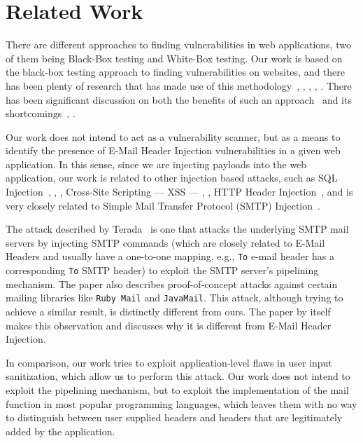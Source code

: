 \section{Related Work}

There are different approaches to finding vulnerabilities in web applications, two of them being Black-Box testing and White-Box testing.
Our work is based on the black-box testing approach to finding vulnerabilities on websites, and there has been plenty of research that has made use of this methodology~\cite{Beizer:1995:BTT:202699}, \cite{Huang}, \cite{kals2006secubat}, \cite{payet13:ears-in-the-wild}, \cite{zanero2005automatic}. There has been significant discussion on both the benefits of such an approach~\cite{black-box} and its shortcomings~\cite{Doupe2012}, \cite{Doupe2010}.

Our work does not intend to act as a vulnerability scanner, but as a means to identify the presence of E-Mail Header Injection vulnerabilities in a given web application. In this sense, since we are injecting payloads into the web application, our work is related to other injection based attacks, such as SQL Injection~\cite{sql1}, \cite{sql0}, \cite{sql2}, Cross-Site Scripting --- XSS --- \cite{Injection1}, \cite{KleinAmit}, HTTP Header Injection~\cite{sessionride}, and is very closely related to Simple Mail Transfer Protocol (SMTP) Injection~\cite{Terada2015}.

The attack described by Terada~\cite{Terada2015} is one that attacks the underlying SMTP mail servers by injecting SMTP commands (which are closely related to E-Mail Headers and usually have a one-to-one mapping, e.g., \texttt{To} e-mail header has a corresponding \texttt{To} SMTP header) to exploit the SMTP server's pipelining mechanism. The paper also describes proof-of-concept attacks against certain mailing libraries like \texttt{Ruby Mail} and \texttt{JavaMail}. This attack, although trying to achieve a similar result, is distinctly different from ours. The paper by itself makes this observation and discusses why it is different from E-Mail Header Injection.

In comparison, our work tries to exploit application-level flaws in user input sanitization, which allow us to perform this attack. Our work does not intend to exploit the pipelining mechanism, but to exploit the implementation of the mail function in most popular programming languages, which leaves them with no way to distinguish between user supplied headers and headers that are legitimately added by the application.


